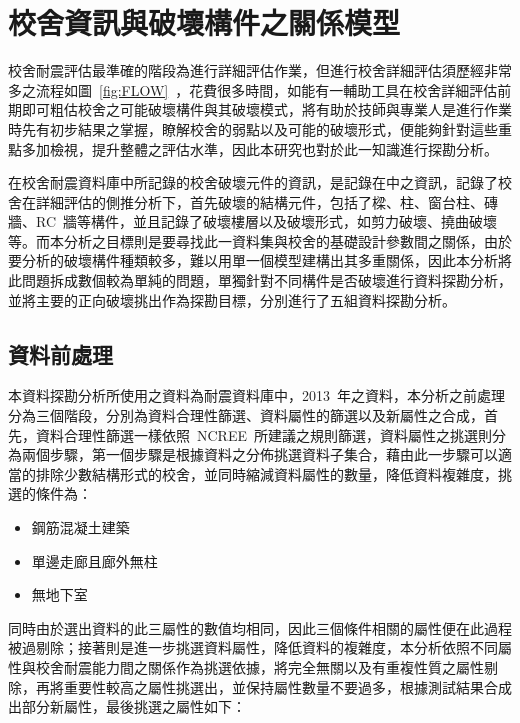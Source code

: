 \renewcommand\thetable{\arabic{chapter}-\arabic{table}}
\chapter{校舍資訊與破壞構件之關係模型}
\label{cha:crack} 

校舍耐震評估最準確的階段為進行詳細評估作業，但進行校舍詳細評估須歷經非常多之流程如圖~\ref{fig:FLOW}~，花費很多時間，如能有一輔助工具在校舍詳細評估前期即可粗估校舍之可能破壞構件與其破壞模式，將有助於技師與專業人是進行作業時先有初步結果之掌握，瞭解校舍的弱點以及可能的破壞形式，便能夠針對這些重點多加檢視，提升整體之評估水準，因此本研究也對於此一知識進行探勘分析。

在校舍耐震資料庫中所記錄的校舍破壞元件的資訊，是記錄在中之資訊，記錄了校舍在詳細評估的側推分析下，首先破壞的結構元件，包括了樑、柱、窗台柱、磚牆、RC~牆等構件，並且記錄了破壞樓層以及破壞形式，如剪力破壞、撓曲破壞等。而本分析之目標則是要尋找此一資料集與校舍的基礎設計參數間之關係，由於要分析的破壞構件種類較多，難以用單一個模型建構出其多重關係，因此本分析將此問題拆成數個較為單純的問題，單獨針對不同構件是否破壞進行資料探勘分析，並將主要的正向破壞挑出作為探勘目標，分別進行了五組資料探勘分析。


\section{資料前處理}

本資料探勘分析所使用之資料為耐震資料庫中，2013~年之資料，本分析之前處理分為三個階段，分別為資料合理性篩選、資料屬性的篩選以及新屬性之合成，首先，資料合理性篩選一樣依照~NCREE~所建議之規則篩選，資料屬性之挑選則分為兩個步驟，第一個步驟是根據資料之分佈挑選資料子集合，藉由此一步驟可以適當的排除少數結構形式的校舍，並同時縮減資料屬性的數量，降低資料複雜度，挑選的條件為：

\begin{itemize}
\item 鋼筋混凝土建築
\item 單邊走廊且廊外無柱
\item 無地下室
\end{itemize}

同時由於選出資料的此三屬性的數值均相同，因此三個條件相關的屬性便在此過程被過剔除；接著則是進一步挑選資料屬性，降低資料的複雜度，本分析依照不同屬性與校舍耐震能力間之關係作為挑選依據，將完全無關以及有重複性質之屬性剔除，再將重要性較高之屬性挑選出，並保持屬性數量不要過多，根據測試結果合成出部分新屬性，最後挑選之屬性如下：

